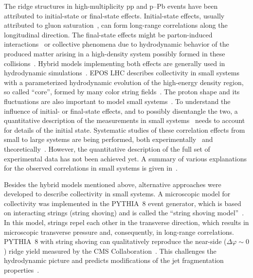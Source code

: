 The ridge structures in high-multiplicity pp and p--Pb events have been attributed to initial-state or final-state effects. Initial-state effects, usually attributed to gluon saturation~\cite{Dusling:2012cg,Bzdak:2013zma}, can form long-range
correlations along the longitudinal direction. The final-state effects might be parton-induced interactions~\cite{Arbuzov:2011yr} or collective phenomena due to hydrodynamic behavior of the produced matter arising in a high-density system possibly formed in these collisions~\cite{Weller:2017tsr,Zhao:2017rgg}. 
Hybrid models implementing both effects are generally used in hydrodynamic simulations~\cite{Greif:2017bnr,Mantysaari:2017cni}. EPOS LHC describes collectivity in small systems with a parameterized hydrodynamic evolution of the high-energy density region, so called ``core'', formed by many color string fields~\cite{Pierog:2013ria}.
The proton shape and its fluctuations are also important to model small systems~\cite{Mantysaari:2017cni}.
To understand the influence of initial- or final-state effects, and to possibly disentangle the two, a quantitative description of the measurements in small systems~\cite{Schenke:2019pmk,Schenke:2020mbo} needs to account for details of the initial state.
Systematic studies of these correlation effects from small to large systems are being performed, both experimentally~\cite{Acharya:2019vdf} and theoretically~\cite{Schenke:2020mbo}.
However, the quantitative description of the full set of experimental data has not been achieved yet.
A summary of various explanations for the observed correlations in small systems is given in~\cite{Strickland:2018exs,Loizides:2016tew,Nagle:2018nvi,Loizides:2016tew}.

Besides the hybrid models mentioned above, alternative approaches were developed to describe collectivity in small systems. A microscopic model for collectivity was implemented in the PYTHIA~8 event generator, which is based on interacting strings (string shoving) and is called the “string shoving model”~\cite{Bierlich:2017vhg}. In this model, strings repel each other in the transverse direction, which results in microscopic transverse pressure and, consequently, in long-range correlations. PYTHIA~8 with string shoving can qualitatively reproduce the near-side ($\Delta\varphi\sim0$) ridge yield measured by the CMS Collaboration~\cite{Khachatryan:2016txc}. This challenges the hydrodynamic picture and predicts modifications of the jet fragmentation properties~\cite{Bierlich:2019ixq}.

